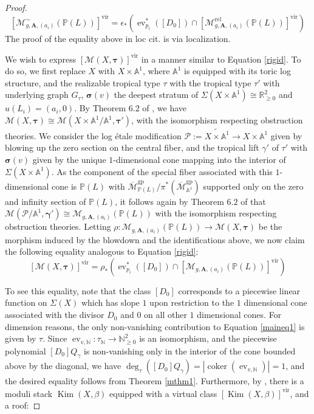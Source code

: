 \documentclass[12pt, oneside]{amsart}   	%
\newcounter{thm}
\newcommand{\NN}{\mathbb{N}}
\newcommand{\vir}{\operatorname{vir}}
\newcommand{\ev}{\operatorname{ev}}
\newcommand{\gp}{\operatorname{gp}}
\newcommand{\rel}{\operatorname{rel}}
\newcommand{\coker}{\operatorname{coker}}
\numberwithin{equation}{section}
\numberwithin{thm}{section}
\numberwithin{figure}{section}
\begin{document}
\begin{proof}
\begin{equation}\label{rigid}
[ \mathscr{M}^{\sim}_{g,\textbf{A},(a_i)}(\mathbb{P}(L))]^{\vir}  = \epsilon_*(\ev_{p_i}^*([D_0])\cap [\mathscr{M}^{\rel}_{g,\textbf{A},(a_i)}(\mathbb{P}(L))]^{\vir})
\end{equation}
The proof of the equality above in loc cit. is via localization.

We wish to express $[\mathscr{M}(X,\pmb\tau)]^{\vir}$ in a manner similar to Equation \ref{rigid}. To do so, we first replace $X$ with $X\times \mathbb{A}^1$, where $\mathbb{A}^1$ is equipped with its toric log structure, and the realizable tropical type $\tau$ with the tropical type $\tau'$ with underlying graph $G_\tau$, $\pmb\sigma(v)$ the deepest stratum of $\Sigma(X\times \mathbb{A}^1) \cong \mathbb{R}_{\ge 0}^2$ and $u(L_i) = (a_i,0)$. By Theorem $6.2$ of \cite{trglue}, we have $\mathscr{M}(X,\pmb\tau) \cong \mathscr{M}(X\times \mathbb{A}^1/\mathbb{A}^1,\pmb\tau')$, with the isomorphism respecting obstruction theories. We consider the log \'etale modification $\mathcal{P}:= \widetilde{X\times\mathbb{A}^1} \rightarrow X\times \mathbb{A}^1$ given by blowing up the zero section on the central fiber, and the tropical lift $\gamma'$ of $\tau'$ with $\pmb\sigma(v)$ given by the unique $1$-dimensional cone mapping into the interior of $\Sigma(X\times \mathbb{A}^1)$. As the component of the special fiber associated with this $1$-dimensional cone is $\mathbb{P}(L)$ with $\overline{\mathcal{M}}_{\mathbb{P}(L)}^{\gp}/\pi^*(\overline{\mathcal{M}}_{\mathbb{A}^1}^{\gp})$ supported only on the zero and infinity section of $\mathbb{P}(L)$, it follows again by Theorem $6.2$ of \cite{trglue} that $\mathscr{M}(\mathcal{P}/\mathbb{A}^1,\pmb\gamma') \cong \mathscr{M}_{g,\textbf{A},(a_i)}(\mathbb{P}(L))$ with the isomorphism respecting obstruction theories. Letting $\rho: \mathscr{M}_{g,\textbf{A},(a_i)}(\mathbb{P}(L)) \rightarrow \mathscr{M}(X,\pmb\tau)$ be the morphism induced by the blowdown and the identifications above, we now claim the following equality analogous to Equation \ref{rigid}:
\begin{equation}\label{localiz}
[\mathscr{M}(X,\pmb\tau)]^{\vir} = \rho_*(\ev_{p_i}^*([D_0])\cap [\mathscr{M}_{g,\textbf{A},(a_i)}(\mathbb{P}(L))]^{\vir})
\end{equation}

To see this equality, note that the class $[D_0]$ corresponds to a piecewise linear function on $\Sigma(X)$ which has slope $1$ upon restriction to the $1$ dimensional cone associated with the divisor $D_0$ and $0$ on all other $1$ dimensional cones. For dimension reasons, the only non-vanishing contribution to Equation \ref{maineq1} is given by $\tau$. Since $\ev_{v,\NN}: \tau_{\NN} \rightarrow \NN_{\ge 0}^2$ is an isomorphism, and the piecewise polynomial $[D_0]Q_{\gamma}$ is non-vanishing only in the interior of the cone bounded above by the diagonal, we have $\deg_{\tau}([D_0]Q_{\gamma}) = |\coker(\ev_{v,\NN})| = 1$, and the desired equality follows from Theorem \ref{mthm1}.  Furthermore, by \cite[Theorem $1.1$]{compGW}, there is a moduli stack $\operatorname{Kim}(X,\beta)$ equipped with a virtual class $[\operatorname{Kim}(X,\beta)]^{\vir}$, and a roof:


\end{proof}
\end{document}

